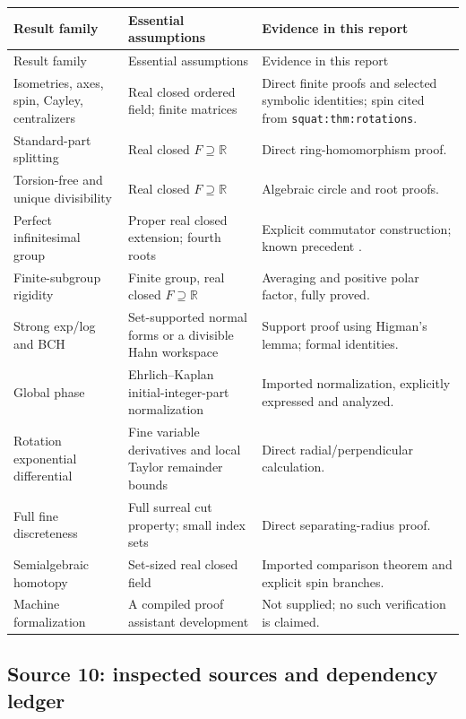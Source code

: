 \documentclass[11pt,letterpaper]{article}
\numberwithin{equation}{section}
\theoremstyle{definition}
\theoremstyle{remark}
\newcommand{\R}{\mathbb R}
\begin{document}
\begin{longtable}{L{0.29\textwidth}L{0.36\textwidth}L{0.26\textwidth}}
\toprule
Result family & Essential assumptions & Evidence in this report\\
\midrule
\endfirsthead
\toprule Result family & Essential assumptions & Evidence in this report\\\midrule
\endhead
Isometries, axes, spin, Cayley, centralizers & Real closed ordered field; finite matrices & Direct finite proofs and selected symbolic identities; spin cited from \texttt{squat:thm:rotations}.\\
Standard-part splitting & Real closed \(F\supseteq\R\) & Direct ring-homomorphism proof.\\
Torsion-free and unique divisibility & Real closed \(F\supseteq\R\) & Algebraic circle and root proofs.\\
Perfect infinitesimal group & Proper real closed extension; fourth roots & Explicit commutator construction; known precedent \cite{BP}.\\
Finite-subgroup rigidity & Finite group, real closed \(F\supseteq\R\) & Averaging and positive polar factor, fully proved.\\
Strong exp/log and BCH & Set-supported normal forms or a divisible Hahn workspace & Support proof using Higman's lemma; formal identities.\\
Global phase & Ehrlich--Kaplan initial-integer-part normalization & Imported normalization, explicitly expressed and analyzed.\\
Rotation exponential differential & Fine variable derivatives and local Taylor remainder bounds & Direct radial/perpendicular calculation.\\
Full fine discreteness & Full surreal cut property; small index sets & Direct separating-radius proof.\\
Semialgebraic homotopy & Set-sized real closed field & Imported comparison theorem \cite{BO} and explicit spin branches.\\
Machine formalization & A compiled proof assistant development & Not supplied; no such verification is claimed.\\
\bottomrule
\end{longtable}

\subsection{Source 10: inspected sources and dependency ledger}\label{e3:cut:sub:ledger10}
\end{document}
